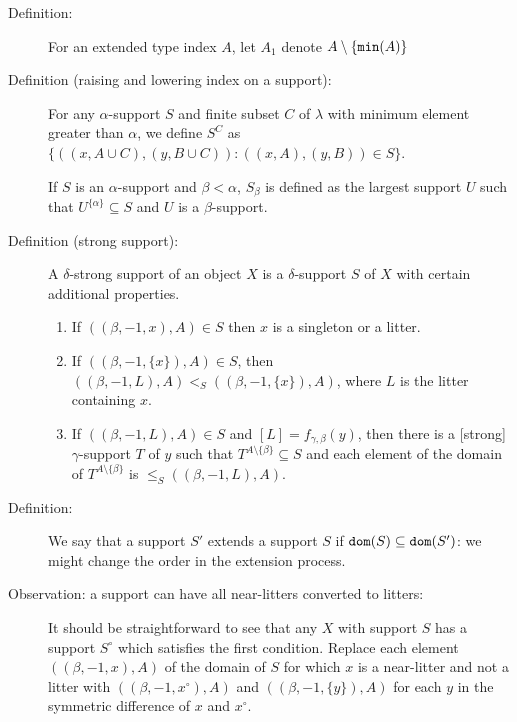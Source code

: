 \documentclass[112pt]{article}
\begin{document}
\begin{description}

\item[Definition:]  For an extended type index $A$, let $A_1$ denote $A \setminus \{{\tt min}(A)\}$

\item[Definition (raising and lowering index on a support):]  For any $\alpha$-support $S$ and finite subset $C$ of $\lambda$ with minimum element greater than $\alpha$, we define $S^C$ as
$\{((x,A\cup C),(y,B\cup C)):((x,A),(y,B)) \in S\}$.

If $S$ is an $\alpha$-support and $\beta<\alpha$, $S_\beta$ is defined as the largest support $U$ such that $U^{\{\alpha\}} \subseteq S$ and $U$ is a $\beta$-support.

\item[Definition (strong support):]  A $\delta$-strong support of an object $X$ is a $\delta$-support $S$ of $X$ with certain additional properties.

\begin{enumerate}

\item  If $((\beta,-1,x),A) \in S$ then $x$ is a singleton or a litter.

\item  If $((\beta,-1,\{x\}),A) \in S$, then $((\beta,-1,L),A) <_S ((\beta,-1,\{x\}),A)$, where $L$ is the litter containing $x$.

\item  If $((\beta,-1,L),A) \in S$ and $[L]=f_{\gamma,\beta}(y)$, then there is a [strong] $\gamma$-support $T$ of $y$ such that $T^{A \setminus \{\beta\}} \subseteq S$ and each element of the domain of $T^{A \setminus \{\beta\}}$ is $\leq_S ((\beta,-1,L),A)$.

\end{enumerate}

\item[Definition:]  We say that a support $S'$ extends a support $S$ if ${\tt dom}(S) \subseteq {\tt dom}(S')$:  we might change the order in the extension process.

\item[Observation:  a support can have all near-litters converted to litters:]  It should be straightforward to see that any $X$ with support $S$ has a support $S^\circ$ which satisfies the first condition.  Replace each
element $((\beta,-1,x),A)$ of the domain of $S$ for which $x$ is a near-litter and not a litter with $((\beta,-1,x^\circ),A)$ and $((\beta,-1,\{y\}),A)$ for each $y$ in the symmetric difference of $x$ and $x^\circ$.


\end{description}
\end{document}
